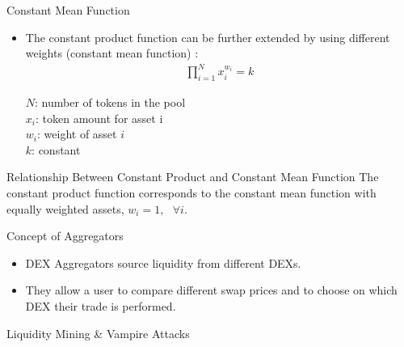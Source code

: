 \documentclass[]{beamer}
\begin{document}
\begin{frame}{Constant Mean Function}
\begin{itemize}
	\item The constant product function can be further extended by using different weights (constant mean function) \cite{BAL}:
		\begin{align*}
			\prod_{i=1}^N x_i^{w_i}= k
		\end{align*}

		$N$: number of tokens in the pool\\
		$x_i$: token amount for asset i\\
		$w_i$: weight of asset $i$\\
		$k$: constant
\end{itemize}

	\vspace{0.5cm}

	\begin{keytakeaway}{Relationship Between Constant Product and Constant Mean Function}
	The constant product function corresponds to the constant mean function with equally weighted assets, $w_i = 1, \text{ } \forall i$.
	\end{keytakeaway}

\end{frame}


\begin{frame}{Concept of Aggregators}
\begin{figure}
	\centering
	\resizebox{0.8\textwidth}{!}{
	\begin{tikzpicture}[scale=1.0, every node/.style={scale=1.0}]
			
	\end{tikzpicture}}
\end{figure}
	
\begin{itemize}
	\item DEX Aggregators source liquidity from different DEXs.
	\item They allow a user to compare different swap prices and to choose on which DEX their trade is performed.
\end{itemize}

\end{frame}


\begin{frame}{Liquidity Mining \& Vampire Attacks}
	\begin{figure}[h!]
		\begin{center}
			
		\end{center}
	\end{figure}
\end{frame}
\end{document}
